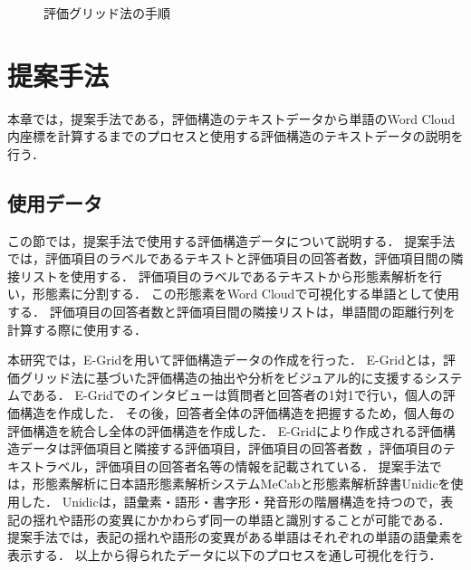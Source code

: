 \documentclass[syuuron]{kuee}
\begin{document}
		\begin{figure}
			\begin{center}
			\end{center}
			\caption{評価グリッド法の手順\cite{egm6}}
	  		\label{fig:egm1}
		\end{figure}

\chapter{提案手法}
	本章では，提案手法である，評価構造のテキストデータから単語のWord Cloud内座標を計算するまでのプロセスと使用する評価構造のテキストデータの説明を行う．
	
	\section{使用データ}
		この節では，提案手法で使用する評価構造データについて説明する．
		提案手法では，評価項目のラベルであるテキストと評価項目の回答者数，評価項目間の隣接リストを使用する．
		評価項目のラベルであるテキストから形態素解析を行い，形態素に分割する．
		この形態素をWord Cloudで可視化する単語として使用する．
		評価項目の回答者数と評価項目間の隣接リストは，単語間の距離行列を計算する際に使用する．
		
		本研究では，E-Gridを用いて評価構造データの作成を行った．
		E-Gridとは，評価グリッド法に基づいた評価構造の抽出や分析をビジュアル的に支援するシステムである．
		E-Gridでのインタビューは質問者と回答者の1対1で行い，個人の評価構造を作成した．
		その後，回答者全体の評価構造を把握するため，個人毎の評価構造を統合し全体の評価構造を作成した．
		E-Gridにより作成される評価構造データは評価項目と隣接する評価項目，評価項目の回答者数 ，評価項目のテキストラベル，評価項目の回答者名等の情報を記載されている．
		提案手法では，形態素解析に日本語形態素解析システムMeCab\cite{mcb1}と形態素解析辞書Unidicを使用した．
		Unidicは，語彙素・語形・書字形・発音形の階層構造を持つので，表記の揺れや語形の変異にかかわらず同一の単語と識別することが可能である．
		提案手法では，表記の揺れや語形の変異がある単語はそれぞれの単語の語彙素を表示する．
		以上から得られたデータに以下のプロセスを通し可視化を行う．		
		
\end{document}
